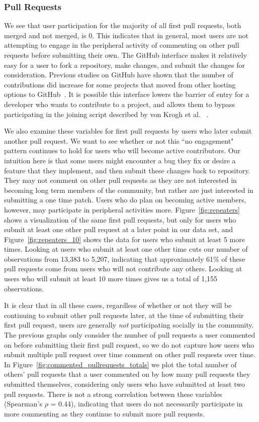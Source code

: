 \documentclass{sigchi}
\begin{document}
\subsubsection{Pull Requests}

We see that user participation for the majority of all first pull requests, both
merged and not merged, is 0. This indicates that in general, most users are not
attempting to engage in the peripheral activity of commenting on other pull
requests before submitting their own. The GitHub interface makes it relatively
easy for a user to fork a repository, make changes, and submit the changes for
consideration. Previous studies on GitHub have shown that the number of
contributions did increase for some projects that moved from other hosting
options to GitHub~\cite{mcdonald_performance_2013}. It is possible this
interface lowers the barrier of entry for a developer who wants to contribute to
a project, and allows them to bypass participating in the joining script
described by von Krogh et al. ~\cite{von_krogh_community_2003}.

We also examine these variables for first pull requests by users who later
submit another pull request. We want to see whether or not this ``no engagement"
pattern continues to hold for users who will become active contributors. Our
intuition here is that some users might encounter a bug they fix or desire a
feature that they implement, and then submit these changes back to repository.
They may not comment on other pull requests as they are not interested in
becoming long term members of the community, but rather are just interested in
submitting a one time patch. Users who do plan on becoming active members,
however, may participate in peripheral activities more.
Figure~\ref{fig:repeaters} shows a visualization of the same first pull
requests, but only for users who submit at least one other pull request at a
later point in our data set, and Figure~\ref{fig:repeaters_10} shows the data
for users who submit at least 5 more times. Looking at users who submit at least
one other time cuts our number of observations from 13,383 to 5,207, indicating
that approximately 61\% of these pull requests come from users who will not
contribute any others. Looking at users who will submit at least 10 more times
gives us a total of 1,155 observations.

It is clear that in all these cases, regardless of whether or not they will be
continuing to submit other pull requests later, at the time of submitting their
first pull request, users are generally \textit{not} participating socially in
the community. The previous graphs only consider the number of pull requests a
user commented on before submitting their first pull request, so we do not
capture how users who submit multiple pull request over time comment on other
pull requests over time. In Figure~\ref{fig:commented_pullrequests_totals} we
plot the total number of others' pull requests that a user commented on by how
many pull requests they submitted themselves, considering only users who have
submitted at least two pull requests. There is not a strong correlation between
these variables (Spearman's $\rho$ = 0.44), indicating that users do not
necessarily participate in more commenting as they continue to submit more pull
requests.
\end{document}
